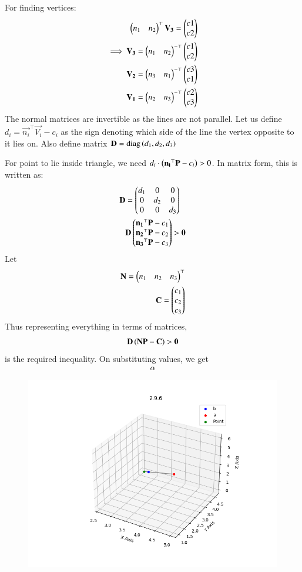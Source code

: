 \documentclass[journal,12pt,onecolumn]{IEEEtran}
\theoremstyle{remark}
\begin{document}
For finding vertices:
\begin{align}
 \begin{pmatrix}n_1 & n_2\end{pmatrix}^\top\mathbf{V_3} = \begin{pmatrix}c1 \\ c2\end{pmatrix} \\
 \implies \mathbf{V_3} = \begin{pmatrix}n_1 & n_2\end{pmatrix}^{-\top}\begin{pmatrix}c1 \\ c2\end{pmatrix} \\
 \mathbf{V_2} = \begin{pmatrix}n_3 & n_1\end{pmatrix}^{-\top}\begin{pmatrix}c3 \\ c1\end{pmatrix} \\
 \mathbf{V_1} = \begin{pmatrix}n_2 & n_3\end{pmatrix}^{-\top}\begin{pmatrix}c2 \\ c3\end{pmatrix}
\end{align}
The normal matrices are invertible as the lines are not parallel.
Let us define $d_i = \vec{n_i}^\top\vec{V_i}-c_i$ as the sign denoting which side of the line the vertex opposite to it lies on. Also define matrix $\mathbf{D} = \text{diag}\left(d_1,d_2,d_3\right)$ \par\noindent
For point to lie inside triangle, we need $d_i\cdot\left(\mathbf{n_i}^\top\mathbf{P}-c_i\right) > 0$. In matrix form, this is written as:
\begin{align}
\mathbf{D} &= \begin{pmatrix}d_1 & 0 & 0 \\ 0 & d_2 & 0 \\ 0 & 0 & d_3\end{pmatrix} \\
  &\mathbf{D}\begin{pmatrix}\mathbf{n_1}^\top\mathbf{P}-c_1 \\ \mathbf{n_2}^\top\mathbf{P}-c_2 \\ \mathbf{n_3}^\top\mathbf{P}-c_3\end{pmatrix} > \mathbf{0}
\end{align}
Let
\begin{align}
 \mathbf{N} = \begin{pmatrix}n_1 & n_2 & n_3\end{pmatrix}^\top \\
 \mathbf{C} = \begin{pmatrix}c_1 \\ c_2 \\ c_3\end{pmatrix}
\end{align}
Thus representing everything in terms of matrices,
\begin{align}
 \mathbf{D}\left(\mathbf{N}\mathbf{P}-\mathbf{C}\right) > \mathbf{0}
\end{align}
is the required inequality. On substituting values, we get
\begin{align}
 \alpha
\end{align}
\begin{figure}[H]
    \centering
    \includegraphics{figs/plot.png}
    \caption*{}
    \label{fig:plot}
\end{figure}
\end{document}
